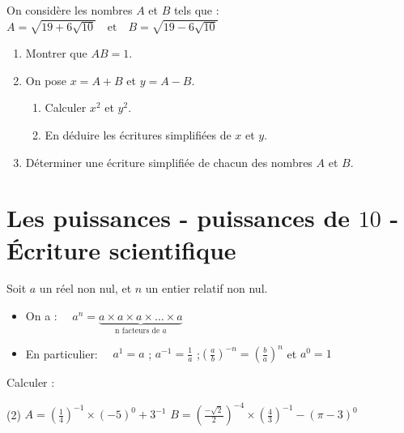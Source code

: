 \documentclass[10pt, a4paper]{article}
\begin{document}
\begin{Application}[][20 min]
On considère les nombres $A$ et $B$ tels que :
$A = \sqrt{19 + 6\sqrt{10}} \quad \text{et} \quad B = \sqrt{19 - 6\sqrt{10}}$
\begin{enumerate}
\item Montrer que $AB = 1$.
\item On pose $x = A + B$ et $y = A - B$.
\begin{enumerate}
\item Calculer $x^2$ et $y^2$.
\item En déduire les écritures simplifiées de $x$ et $y$.
\end{enumerate}
\item Déterminer une écriture simplifiée de chacun des nombres $A$ et $B$.
\end{enumerate}
\end{Application}

\section{Les puissances - puissances de $10$ - Écriture scientifique }

\begin{Definition}[]
Soit $a$ un réel non nul, et $n$ un entier relatif non nul.
\begin{itemize}
\item On a :~~
    $a^n = \underbrace{a \times a \times a \times \dots \times a}_{\text{n facteurs de } a}$

    \item En particulier:~~ $a^1 = a$ \quad ; \quad $a^{-1} = \frac{1}{a}$ \quad;\quad $\left(\frac{a}{b}\right)^{-n} = \left(\frac{b}{a}\right)^n$ \quad et \quad $a^0 = 1$
\end{itemize}
\end{Definition}

\begin{Application}[][10 min]
 Calculer :
\begin{tasks}[label=$\bullet$, label-width=5pt, item-indent=15pt](2)
\task $A = \left(\frac{1}{4}\right)^{-1} \times (-5)^0 + 3^{-1}$
\task $B = \left(\frac{-\sqrt{2}}{2}\right)^{-4} \times \left(\frac{4}{3}\right)^{-1} - (\pi - 3)^0$
\end{tasks}
\end{Application}
\end{document}
